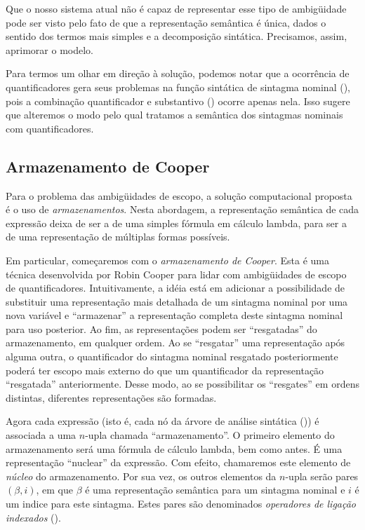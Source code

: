 Que o nosso sistema atual não é capaz de representar esse tipo de ambigüidade pode ser visto pelo fato de que a representação semântica é única, dados o sentido dos termos mais simples e a decomposição sintática. Precisamos, assim, aprimorar o modelo.

Para termos um olhar em direção à solução, podemos notar que a ocorrência de quantificadores gera seus problemas na função sintática de sintagma nominal (), pois a combinação quantificador e substantivo () ocorre apenas nela. Isso sugere que alteremos o modo pelo qual tratamos a semântica dos sintagmas nominais com quantificadores.

\subsection{Armazenamento de Cooper}

Para o problema das ambigüidades de escopo, a solução computacional proposta é o uso de \textit{armazenamentos}. Nesta abordagem, a representação semântica de cada expressão deixa de ser a de uma simples fórmula em cálculo lambda, para ser a de uma representação de múltiplas formas possíveis.

Em particular, começaremos com o \textit{armazenamento de Cooper}. Esta é uma técnica desenvolvida por Robin Cooper para lidar com ambigüidades de escopo de quantificadores. \cite[p.~113]{BlackburnBos:2005} Intuitivamente, a idéia está em adicionar a possibilidade de substituir uma representação mais detalhada de um sintagma nominal por uma nova variável e ``armazenar'' a representação completa deste sintagma nominal para uso posterior. Ao fim, as representações podem ser ``resgatadas'' do armazenamento, em qualquer ordem. Ao se ``resgatar'' uma representação após alguma outra, o quantificador do sintagma nominal resgatado posteriormente poderá ter escopo mais externo do que um quantificador da representação ``resgatada'' anteriormente. Desse modo, ao se possibilitar os ``resgates'' em ordens distintas, diferentes representações são formadas.

Agora cada expressão (isto é, cada nó da árvore de análise sintática ()) é associada a uma $n$-upla chamada ``armazenamento''. O primeiro elemento do armazenamento será uma fórmula de cálculo lambda, bem como antes. É uma representação ``nuclear'' da expressão. Com efeito, chamaremos este elemento de \textit{núcleo} do armazenamento. Por sua vez, os outros elementos da $n$-upla serão pares $(\beta, i)$, em que $\beta$ é uma representação semântica para um sintagma nominal e $i$ é um indice para este sintagma. Estes pares são denominados \textit{operadores de ligação indexados} ().

